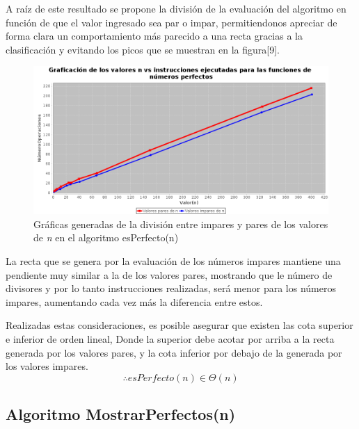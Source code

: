 \documentclass{report}
\begin{document}
         A raíz de este resultado se propone la división de la evaluación del algoritmo en función de que el valor ingresado sea par o impar, permitiendonos apreciar de forma clara un comportamiento más parecido a una recta gracias a la clasificación y evitando los picos que se muestran en la figura[9].
         
         \begin{figure}[!h]
            \centering
        	\includegraphics[width=14cm]{Imagenes/esPerfecto-PI.png}
             \caption{Gráficas generadas de la división entre impares y pares de los valores de \textit{n} en el algoritmo esPerfecto(n) }
             \label{fig:my_label}
         \end{figure}
         
         La recta que se genera por la evaluación de los números impares mantiene una pendiente muy similar a la de los valores pares, mostrando que le número de divisores y por lo tanto instrucciones realizadas, será menor para los números impares, aumentando cada vez más la diferencia entre estos.
         
        Realizadas estas consideraciones, es posible asegurar que existen las cota superior e inferior de orden lineal, Donde la superior debe acotar por arriba a la recta generada por los valores pares, y la cota inferior por debajo de la generada por los valores impares.
        $$ \therefore esPerfecto(n) \in \Theta (n) $$
         
    \subsection*{Algoritmo MostrarPerfectos(n)}
    
\end{document}
